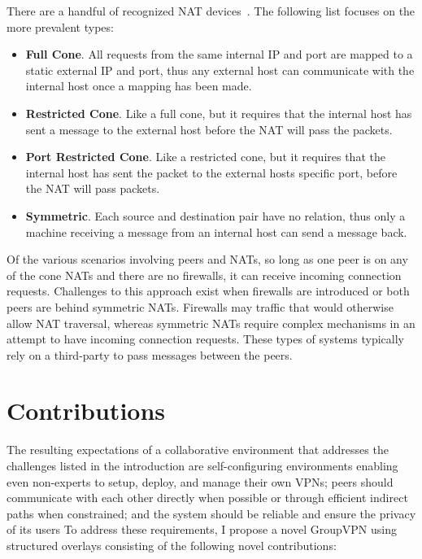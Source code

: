 There are a handful of recognized NAT devices~\cite{stun, p2p_nats_rfc}.  The
following list focuses on the more prevalent types:

\begin{itemize}

\item {\bf Full Cone}. All requests from the same internal IP and port are
mapped to a static external IP and port, thus any external host can communicate
with the internal host once a mapping has been made.

\item {\bf Restricted Cone}. Like a full cone, but it requires that the
internal host has sent a message to the external host before the NAT will pass
the packets.

\item {\bf Port Restricted Cone}. Like a restricted cone, but it requires that
the internal host has sent the packet to the external hosts specific port,
before the NAT will pass packets.

\item {\bf Symmetric}. Each source and destination pair have no relation, thus
only a machine receiving a message from an internal host can send a message
back.

\end{itemize}

Of the various scenarios involving peers and NATs, so long as one peer is on
any of the cone NATs and there are no firewalls, it can receive incoming
connection requests.  Challenges to this approach exist when firewalls are
introduced or both peers are behind symmetric NATs.  Firewalls may traffic that
would otherwise allow NAT traversal, whereas symmetric NATs require complex
mechanisms in an attempt to have incoming connection requests.  These types of
systems typically rely on a third-party to pass messages between the peers.

\section{Contributions}

The resulting expectations of a collaborative environment that addresses the
challenges listed in the introduction are self-configuring environments
enabling even non-experts to setup, deploy, and manage their own VPNs; peers
should communicate with each other directly when possible or through efficient
indirect paths when constrained; and the system should be reliable and ensure
the privacy of its users To address these requirements, I propose a novel
GroupVPN using structured overlays consisting of the following novel
contributions:

